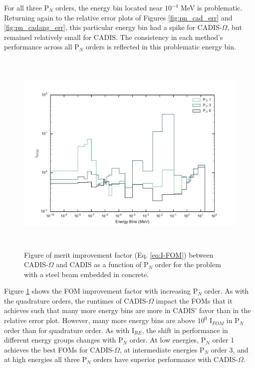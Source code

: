 For all three
P$_N$ orders, the energy bin located near $10^{-4}$ MeV is problematic.
Returning again to the relative error plots of Figures \ref{fig:pn_cad_err}
and \ref{fig:pn_cadang_err}, this
particular energy bin had a spike for CADIS-$\Omega$, but remained relatively
small for CADIS. The consistency in each method's performance across all P$_N$
orders is reflected in this problematic energy bin.

\begin{figure}[h!]
  \centering
  \includegraphics[height=10cm]{./chapters/characterization_probs/figures/angle/prob_1/compare_fom_pN.pdf}
  \caption[Figure of merit improvement factor (Eq. \eqref{eq:I-FOM}) between CADIS-$\Omega$ and
  CADIS as a function of P$_N$ order for steel beam embedded in concrete.]
  {Figure of merit improvement factor (Eq. \eqref{eq:I-FOM}) between CADIS-$\Omega$ and
   CADIS as a function of P$_N$ order for the problem with a
   steel beam embedded in concrete.}
  \label{fig:prob_1_pN_I_FOM}
\end{figure}

Figure \ref{fig:prob_1_pN_I_FOM} shows the FOM improvement factor with
increasing P$_N$ order. As with the quadrature orders, the runtimes of
CADIS-$\Omega$ impact the FOMs that it achieves such that many more energy bins
are more in CADIS' favor than in the relative error plot. However, many more
energy bins are above $10^0$ I$_{FOM}$ in P$_N$ order than for quadrature order.
As with I$_{RE}$, the shift in performance in different energy groups changes
with P$_N$ order. At low energies, P$_N$ order 1 achieves the best FOMs for
CADIS-$\Omega$, at intermediate energies P$_N$ order 3, and at high energies all
three P$_N$ orders have superior performance with CADIS-$\Omega$.

